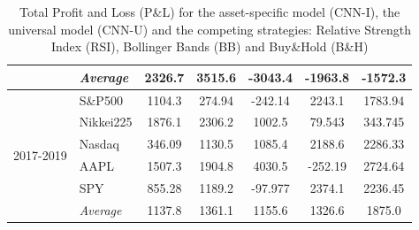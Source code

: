 \documentclass[11pt, a4paper]{article}
\begin{document}
\begin{table}[H]
\begin{tabular}{l|l|ccccc}
 & \textit{Average} & 2326.7    & 3515.6    & -3043.4    & -1963.8      & -1572.3   \\
\hline
\multirow{6}{1cm}{2017-2019}   & S\&P500   & 1104.3  & 274.94  & -242.14 & 2243.1  & 1783.94 \\
          & Nikkei225 & 1876.1  & 2306.2  & 1002.5  & 79.543  & 343.745 \\
          & Nasdaq    & 346.09  & 1130.5  & 1085.4  & 2188.6  & 2286.33  \\
          & AAPL      & 1507.3  & 1904.8  & 4030.5  & -252.19 & 2724.64  \\
          & SPY       & 855.28  & 1189.2  & -97.977 & 2374.1  & 2236.45 \\
          \cline{2-7}
          & \textit{Average}   & 1137.8  & 1361.1  & 1155.6  & 1326.6  & 1875.0 
\end{tabular}
\caption{Total Profit and Loss (P\&L) for the asset-specific model (CNN-I), the universal model (CNN-U) and the competing strategies: Relative Strength Index (RSI), Bollinger Bands (BB) and Buy\&Hold (B\&H)}
\label{tbl:PandL}
\end{table}
\end{document}
